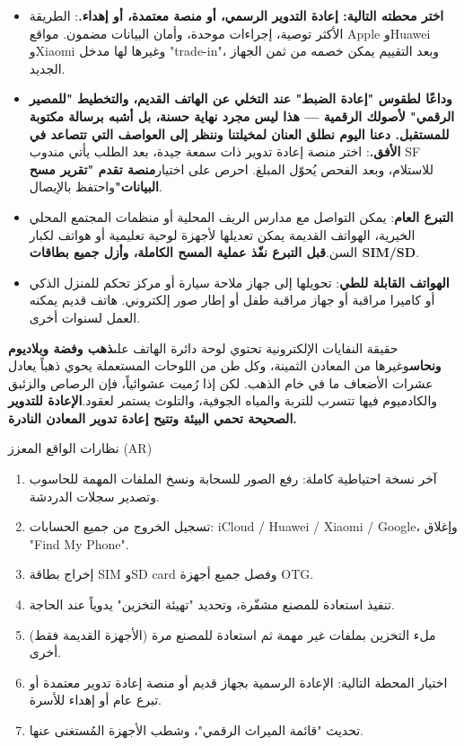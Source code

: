 \begin{itemize}
  \item \textbf{اختر محطته التالية: إعادة التدوير الرسمي، أو منصة معتمدة، أو إهداء.}: الطريقة الأكثر توصية، إجراءات موحدة، وأمان البيانات مضمون. مواقع Apple وHuawei وXiaomi وغيرها لها مدخل "trade-in"، وبعد التقييم يمكن خصمه من ثمن الجهاز الجديد.
  \item \textbf{وداعًا لطقوس "إعادة الضبط" عند التخلي عن الهاتف القديم، والتخطيط "للمصير الرقمي" لأصولك الرقمية — هذا ليس مجرد نهاية حسنة، بل أشبه برسالة مكتوبة للمستقبل. دعنا اليوم نطلق العنان لمخيلتنا وننظر إلى العواصف التي تتصاعد في الأفق.}: اختر منصة إعادة تدوير ذات سمعة جيدة، بعد الطلب يأتي مندوب SF للاستلام، وبعد الفحص يُحوّل المبلغ. احرص على اختيار\textbf{منصة تقدم "تقرير مسح البيانات"}واحتفظ بالإيصال.
  \item \textbf{التبرع العام}: يمكن التواصل مع مدارس الريف المحلية أو منظمات المجتمع المحلي الخيرية، الهواتف القديمة يمكن تعديلها لأجهزة لوحية تعليمية أو هواتف لكبار السن.\textbf{قبل التبرع نفّذ عملية المسح الكاملة، وأزل جميع بطاقات SIM/SD}.
  \item \textbf{الهواتف القابلة للطي}: تحويلها إلى جهاز ملاحة سيارة أو مركز تحكم للمنزل الذكي أو كاميرا مراقبة أو جهاز مراقبة طفل أو إطار صور إلكتروني. هاتف قديم يمكنه العمل لسنوات أخرى.
\end{itemize}

\begin{tcbinfo}{حقيقة النفايات الإلكترونية}
تحتوي لوحة دائرة الهاتف على\textbf{ذهب وفضة وبلاديوم ونحاس}وغيرها من المعادن الثمينة، وكل طن من اللوحات المستعملة يحوي ذهباً يعادل عشرات الأضعاف ما في خام الذهب. لكن إذا رُميت عشوائياً، فإن الرصاص والزئبق والكادميوم فيها تتسرب للتربة والمياه الجوفية، والتلوث يستمر لعقود.\textbf{الإعادة للتدوير الصحيحة تحمي البيئة وتتيح إعادة تدوير المعادن النادرة.}

\end{tcbinfo}

\begin{tcbpractice}{نظارات الواقع المعزز (AR)}
\begin{enumerate}
  \item آخر نسخة احتياطية كاملة: رفع الصور للسحابة ونسخ الملفات المهمة للحاسوب وتصدير سجلات الدردشة.
  \item تسجيل الخروج من جميع الحسابات: iCloud / Huawei / Xiaomi / Google، وإغلاق "Find My Phone".
  \item إخراج بطاقة SIM وSD card وفصل جميع أجهزة OTG.
  \item تنفيذ استعادة للمصنع مشفّرة، وتحديد "تهيئة التخزين" يدوياً عند الحاجة.
  \item (الأجهزة القديمة فقط) ملء التخزين بملفات غير مهمة ثم استعادة للمصنع مرة أخرى.
  \item اختيار المحطة التالية: الإعادة الرسمية بجهاز قديم أو منصة إعادة تدوير معتمدة أو تبرع عام أو إهداء للأسرة.
  \item تحديث "قائمة الميراث الرقمي"، وشطب الأجهزة المُستغنى عنها.
\end{enumerate}

\end{tcbpractice}

